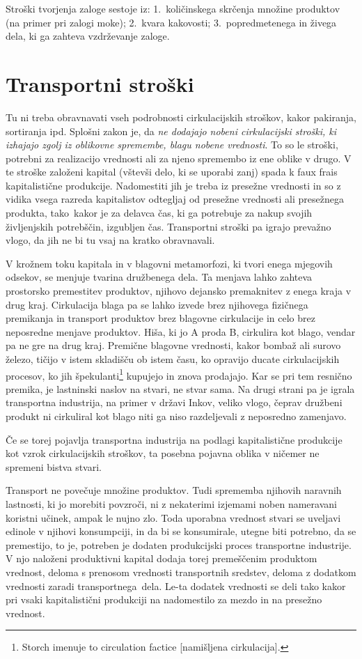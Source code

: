 \documentclass[kapital_02.tex]{subfiles}
\begin{document}
Stroški tvorjenja zaloge sestoje iz: 1.\ količinskega skrčenja množine produktov (na primer pri zalogi moke); 2.\ kvara kakovosti; 3.\ popredmetenega in živega dela, ki ga zahteva vzdrževanje zaloge.

\section{Transportni stroški}

Tu ni treba obravnavati vseh podrobnosti cirkulacijskih stroškov, kakor pakiranja, sortiranja ipd.
Splošni zakon je, da \emph{ne dodajajo nobeni cirkulacijski stroški, ki izhajajo zgolj iz oblikovne spremembe, blagu nobene vrednosti}.
To so le stroški, potrebni za realizacijo vrednosti ali za njeno spremembo iz ene oblike v drugo.
V te stroške založeni kapital (vštevši delo, ki se uporabi zanj) spada k faux frais kapitalistične produkcije.
Nadomestiti jih je treba iz presežne vrednosti in so z vidika vsega razreda kapitalistov odtegljaj od presežne vrednosti ali presežnega produkta, tako\KPEstran\ kakor je za delavca čas, ki ga potrebuje za nakup svojih življenjskih potrebščin, izgubljen čas.
Transportni stroški pa igrajo prevažno vlogo, da jih ne bi tu vsaj na kratko obravnavali.

V krožnem toku kapitala in v blagovni metamorfozi, ki tvori enega mjegovih odsekov, se menjuje tvarina družbenega dela. 
Ta menjava lahko zahteva prostorsko premestitev produktov, njihovo dejansko premaknitev z enega kraja v drug kraj. 
Cirkulacija blaga pa se lahko izvede brez njihovega fizičnega premikanja in transport produktov brez blagovne cirkulacije in celo brez neposredne menjave produktov.
Hiša, ki jo A proda B, cirkulira kot blago, vendar pa ne gre na drug kraj.
Premične blagovne vrednosti, kakor bombaž ali surovo železo, tičijo v istem skladišču ob istem času, ko opravijo ducate cirkulacijskih procesov, ko jih špekulanti\footnote
{Storch imenuje to circulation factice [namišljena cirkulacija].}
kupujejo in znova prodajajo.
Kar se pri tem resnično premika, je lastninski naslov na stvari, ne stvar sama.
Na drugi strani pa je igrala transportna industrija, na primer v državi Inkov, veliko vlogo, čeprav družbeni produkt ni cirkuliral kot blago niti ga niso razdeljevali z neposredno zamenjavo.

Če se torej pojavlja transportna industrija na podlagi kapitalistične produkcije kot vzrok cirkulacijskih stroškov, ta posebna pojavna oblika v ničemer ne spremeni bistva stvari.

Transport ne povečuje množine produktov. Tudi sprememba njihovih naravnih lastnosti, ki jo morebiti povzroči, ni z nekaterimi izjemami noben nameravani koristni učinek, ampak le nujno zlo.
Toda uporabna vrednost stvari se uveljavi edinole v njihovi konsumpciji, in da bi se konsumirale, utegne biti potrebno, da se premestijo, to je, potreben je dodaten produkcijski proces transportne industrije.
V njo naloženi produktivni kapital dodaja torej premeščenim produktom vrednost, deloma s prenosom vrednosti transportnih sredstev, deloma z dodatkom vrednosti zaradi transportnega\KPEstran\ dela.
Le-ta dodatek vrednosti se deli tako kakor pri vsaki kapitalistični produkciji na nadomestilo za mezdo in na presežno vrednost.
\end{document}
